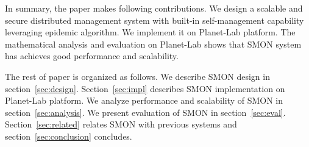 In summary, the paper makes following contributions.  We
design a scalable and secure distributed management system
with built-in self-management capability leveraging epidemic
algorithm.  We implement it on Planet-Lab platform.  The
mathematical analysis and evaluation on Planet-Lab shows
that SMON system has achieves good performance and
scalability.

The rest of paper is organized as follows. We describe SMON
design in section~\ref{sec:design}.
Section~\ref{sec:impl} describes
SMON implementation on Planet-Lab platform. We analyze
performance and scalability of SMON in
section~\ref{sec:analysis}. We present evaluation of SMON in
section~\ref{sec:eval}.  Section~\ref{sec:related} relates
SMON with previous systems and section~\ref{sec:conclusion}
concludes.


